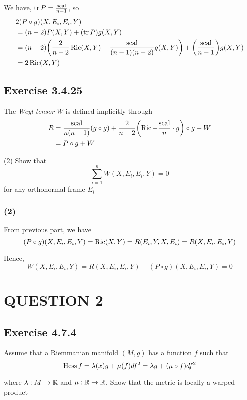 We have, $\operatorname{tr} P = \frac{\operatorname{scal}}{n-1}$, so
\begin{align*}
	&2 (P \circ g)(X, E_i, E_i, Y) \\
	&=(n - 2) P(X, Y) + (\tr P) g(X, Y) \\
	&= (n - 2) \tuple*{\frac{2}{n-2} \Ric(X, Y) - \frac{\scal}{(n-1)(n-2)} g(X, Y)} + \tuple*{\frac{\scal}{n-1}} g(X, Y) \\
	&= 2 \Ric(X, Y)
\end{align*}

\subsection{Exercise 3.4.25}

\begin{problem}[Exercise 3.4.25]
	The \textit{Weyl tensor} $W$ is defined implicitly through
	\begin{align*}
		R &= \frac{\scal}{n(n-1)} (g \circ g) + \frac{2}{n-2} \tuple*{\Ric - \frac{\scal}{n} \cdot g} \circ g + W \\
		&= P \circ g + W
	\end{align*}
	
	(2) Show that
	$$
		\sum_{i=1}^n W(X, E_i, E_i, Y) = 0
	$$
	for any orthonormal frame $E_i$
\end{problem}

\subsubsection{(2)}

From previous part, we have
$$
	(P \circ g)(X, E_i, E_i, Y) = \operatorname{Ric}(X, Y) = R(E_i, Y, X, E_i) = R(X, E_i, E_i, Y)
$$

Hence, 
$$
	W(X, E_i, E_i, Y) = R(X, E_i, E_i, Y) - (P \circ g)(X, E_i, E_i, Y) = 0
$$


\section{QUESTION 2}

\subsection{Exercise 4.7.4}

\begin{problem}[Exercise 4.7.4]
	Assume that a Riemmanian manifold $(M, g)$ has a function $f$ such that
	$$
		\operatorname{Hess} f = \lambda(x) g + \mu(f) df^2 = \lambda g + (\mu \circ f) df^2
	$$
	
	where $\lambda: M \to \mathbb{R}$ and $\mu: \mathbb{R} \to \mathbb{R}$. Show that the metric is locally a warped product
\end{problem}

